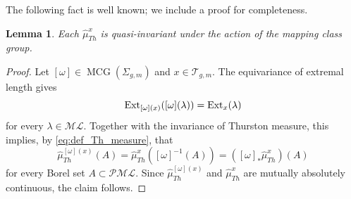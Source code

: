 \documentclass[dvipdfmx]{amsart}
\newtheorem{lemma}{Lemma}[section]
\theoremstyle{remark}
\newcommand{\ext}{{\rm Ext}}
\newcommand{\teich}{\mathcal{T}}
\newcommand{\mcg}{\operatorname{MCG}}
\newcommand{\ThursM}{\mu_{Th}}
\newcommand{\PThursM}{\hat{\mu}_{Th}}
\newcommand{\ml}{\mathcal{ML}}
\newcommand{\pml}{\mathcal{PML}}
\begin{document}
The following fact is well known; we include a proof for completeness.

\begin{lemma}
\label{lem:quasi-invariance}
Each $\PThursM^x$ is quasi-invariant under the action of the mapping class group.
\end{lemma}

\begin{proof}
Let $[\omega]\in\mcg(\Sigma_{g,m})$ and
$x\in\teich_{g,m}$.
The equivariance of extremal length gives
\[
\ext_{[\omega](x)}([\omega](\lambda))
=\ext_x(\lambda)
\]
for every $\lambda\in\ml$.
Together with the invariance of Thurston measure,
this implies, by \eqref{eq:def_Th_measure}, that
\[
\PThursM^{[\omega](x)}(A)
=\PThursM^x([\omega]^{-1}(A))
=([\omega]_*\PThursM^x)(A)
\]
for every Borel set $A\subset\pml$.
Since $\PThursM^{[\omega](x)}$ and $\PThursM^x$
are mutually absolutely continuous, the claim follows.
\end{proof}

\end{document}
